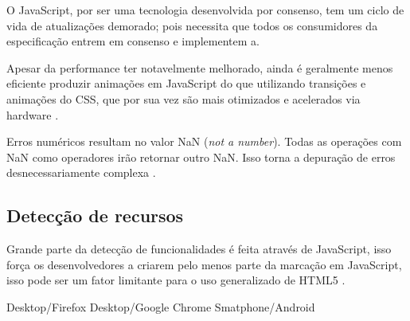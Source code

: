 \begin{draft}
O JavaScript, por ser uma tecnologia desenvolvida por consenso, tem um
ciclo de vida de atualizações demorado; pois necessita que todos os
consumidores da especificação entrem em consenso e implementem a.

Apesar da performance ter notavelmente melhorado, ainda é geralmente
menos eficiente produzir animações em JavaScript do que utilizando
transições e animações do CSS, que por sua vez são mais otimizados
e acelerados via hardware \autocite{html5mostwanted}.

Erros numéricos resultam no valor NaN (\textit{not a number}).
Todas as operações com NaN como operadores irão retornar outro
NaN. Isso torna a depuração de erros desnecessariamente complexa
\autocite{html5mostwanted}.

\subsection{Detecção de recursos}

Grande parte da detecção de funcionalidades é feita através de
JavaScript, isso força os desenvolvedores a criarem pelo menos parte da
marcação em JavaScript, isso pode ser um fator limitante para o uso
generalizado de HTML5 \autocite{diveIntohtml}.

Desktop/Firefox
Desktop/Google Chrome
Smatphone/Android

\end{draft}
